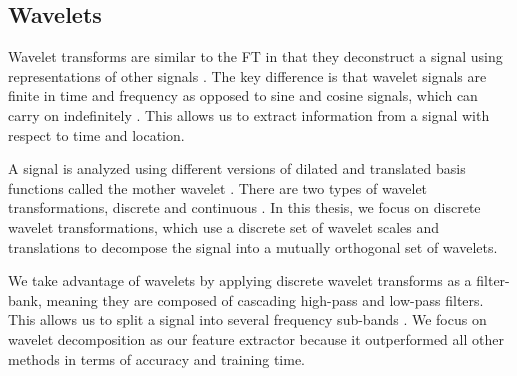 \documentclass{turabian-thesis}[12pt]
\begin{document}
\subsection{Wavelets}

Wavelet transforms are similar to the FT in that they deconstruct a signal using representations of other signals \cite{misiti_wavelets_2013}. The key difference is that wavelet signals are finite in time and frequency as opposed to sine and cosine signals, which can carry on indefinitely \cite{strang_wavelets_1996}. This allows us to extract information from a signal with respect to time and location.




A signal is analyzed using different versions of dilated and translated basis functions called the mother wavelet  \cite{strang_wavelets_1996}. There are two types of wavelet transformations, discrete and continuous \cite{imani_curve_2016}. In this thesis, we focus on discrete wavelet transformations, which use a discrete set of wavelet scales and translations to decompose the signal into a mutually orthogonal set of wavelets. 

We take advantage of wavelets by applying discrete wavelet transforms as a filter-bank, meaning they are composed of cascading high-pass and low-pass filters. This allows us to split a signal into several frequency sub-bands  \cite{strang_wavelets_1996}. We focus on wavelet decomposition as our feature extractor because it outperformed all other methods in terms of accuracy and training time.



\end{document}
